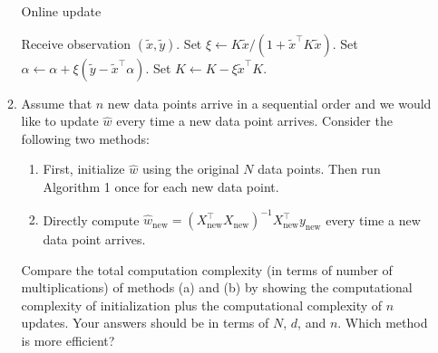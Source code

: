 \documentclass[a3paper,12pt]{extarticle} %
\begin{document}
\begin{enumerate}
\begin{enumerate}
           
            \begin{algorithm}
            \caption{Online update}
            \begin{algorithmic}[1]
                \State Receive observation \( (\tilde{x}, \tilde{y}) \).
                \State Set \( \xi \leftarrow K \tilde{x} / (1 + \tilde{x}^\top K \tilde{x}) \).
                \State Set \( \alpha \leftarrow \alpha + \xi (\tilde{y} - \tilde{x}^\top \alpha) \).
                \State Set \( K \leftarrow K - \xi \tilde{x}^\top K \).
            \end{algorithmic}
            \end{algorithm}
            \item Assume that \( n \) new data points arrive in a sequential order and we would like to update \( \hat{w} \) every time a new data point arrives. Consider the following two methods:
            \begin{enumerate}
                \item First, initialize \( \hat{w} \) using the original \( N \) data points. Then run Algorithm 1 once for each new data point.
                \item Directly compute \( \hat{w}_{\text{new}} = (X_{\text{new}}^\top X_{\text{new}})^{-1} X_{\text{new}}^\top y_{\text{new}} \) every time a new data point arrives.
            \end{enumerate}
            Compare the total computation complexity (in terms of number of multiplications) of methods (a) and (b) by showing the computational complexity of initialization plus the computational complexity of \( n \) updates. Your answers should be in terms of \( N \), \( d \), and \( n \). Which method is more efficient?


\end{enumerate}
\end{enumerate}
\end{document}
